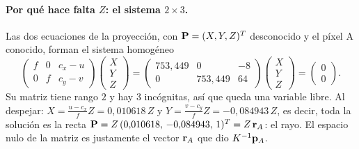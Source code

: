 \paragraph{Por qué hace falta $Z$: el sistema $2\times3$.} Las dos ecuaciones de la proyección, con $\mathbf{P}=(X,Y,Z)^T$ desconocido y
el píxel A conocido, forman el sistema homogéneo
\begin{equation}
\begin{pmatrix}f&0&c_x-u\\0&f&c_y-v\end{pmatrix}\begin{pmatrix}X\\Y\\Z\end{pmatrix}=
\begin{pmatrix} 753{,}449 & 0 & -8 \\ 0 & 753{,}449 & 64 \end{pmatrix}\begin{pmatrix}X\\Y\\Z\end{pmatrix}=\begin{pmatrix}0\\0\end{pmatrix}.
\end{equation}
Su matriz tiene rango $2$ y hay $3$ incógnitas, así que queda una variable libre. Al despejar:
$X=\tfrac{u-c_x}{f}Z=0{,}010618\,Z$ y $Y=\tfrac{v-c_y}{f}Z=-0{,}084943\,Z$, es decir, toda la solución es la recta
$\mathbf{P}=Z\,(0{,}010618,\,-0{,}084943,\,1)^T=Z\,\mathbf{r}_A$: el rayo. El espacio nulo de la matriz es justamente el vector $\mathbf{r}_A$ que dio $K^{-1}\mathbf{p}_A$.

